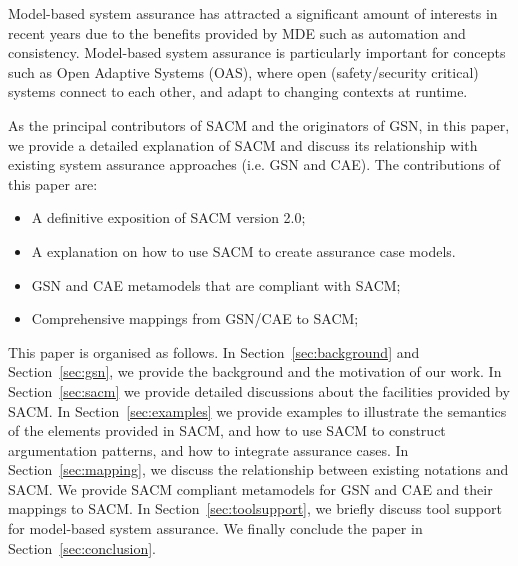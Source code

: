 Model-based system assurance has attracted a significant amount of interests in recent years due to the benefits provided by MDE such as automation and consistency. 
Model-based system assurance is particularly important for concepts such as Open Adaptive Systems (OAS), where open (safety/security critical) systems connect to each other, and adapt to changing contexts at runtime. 

As the principal contributors of SACM and the originators of GSN, in this paper, we provide a detailed explanation of SACM and discuss its relationship with existing system assurance approaches (i.e. GSN and CAE). 
The contributions of this paper are:
\begin{itemize}
	\item A definitive exposition of SACM version 2.0;
	\item A explanation on how to use SACM to create assurance case models.
	\item GSN and CAE metamodels that are compliant with SACM;
	\item Comprehensive mappings from GSN/CAE to SACM;
\end{itemize}

This paper is organised as follows. 
In Section~\ref{sec:background} and Section~\ref{sec:gsn}, we provide the background and the motivation of our work. 
In Section~\ref{sec:sacm} we provide detailed discussions about the facilities provided by SACM.
In Section~\ref{sec:examples} we provide examples to illustrate the semantics of the elements provided in SACM, and how to use SACM to construct argumentation patterns, and how to integrate assurance cases.
In Section~\ref{sec:mapping}, we discuss the relationship between existing notations and SACM. 
We provide SACM compliant metamodels for GSN and CAE and their mappings to SACM. 
In Section~\ref{sec:toolsupport}, we briefly discuss tool support for model-based system assurance. 
We finally conclude the paper in Section~\ref{sec:conclusion}.

